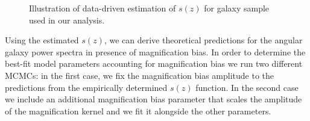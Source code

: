 \documentclass[a4paper,11pt]{article}
\begin{document}
      \begin{figure}
        \begin{center}
          \caption{Illustration of data-driven estimation of $s(z)$ for galaxy sample used in our analysis.} 
          \label{fig:s-func-estimation}
        \end{center}
      \end{figure}

      Using the estimated $s(z)$, we can derive theoretical predictions for the angular galaxy power spectra in presence of magnification bias. In order to determine the best-fit model parameters accounting for magnification bias we run two different MCMCs: in the first case, we fix the magnification bias amplitude to the predictions from the empirically determined $s(z)$ function. In the second case we include an additional magnification bias parameter that scales the amplitude of the magnification kernel and we fit it alongside the other parameters.
\end{document}
